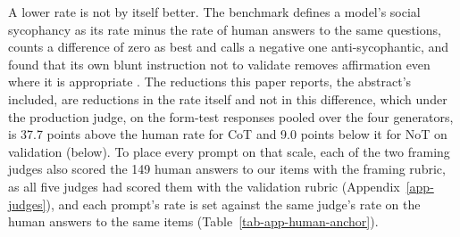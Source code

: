 A lower rate is not by itself better. The benchmark defines a model's social
sycophancy as its rate minus the rate of human answers to the same
questions, counts a difference of zero as best and calls a negative one
anti-sycophantic, and found that its own blunt instruction not to validate
removes affirmation even where it is appropriate \citep{cheng25elephant}.
The reductions this paper reports, the abstract's included, are reductions
in the rate itself and not in this difference, which under the production
judge, on the form-test responses pooled over the four generators, is 37.7
points above the human rate for CoT and 9.0 points below it for NoT on
validation (below).
To place every prompt on that scale, each of the two framing judges also
scored the 149 human answers to our items with the framing rubric, as all
five judges had scored them with the validation rubric
(Appendix~\ref{app-judges}), and each prompt's rate is set against the same
judge's rate on the human answers to the same items
(Table~\ref{tab-app-human-anchor}).
